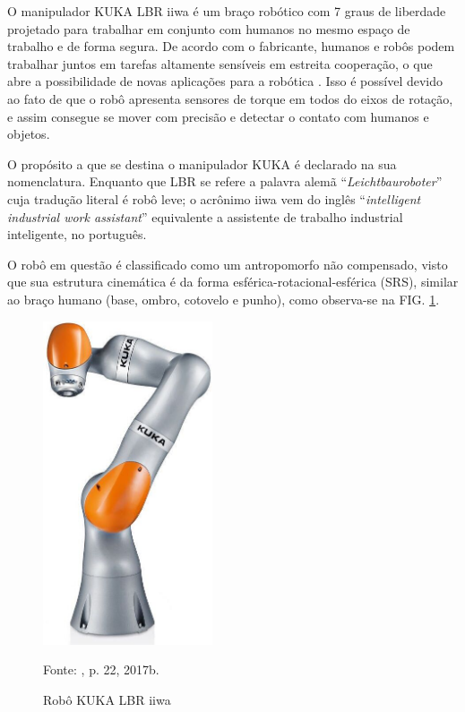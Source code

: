 O manipulador KUKA LBR iiwa é um braço robótico com 7 graus de liberdade projetado para trabalhar em conjunto com humanos no mesmo espaço de trabalho e de forma segura. De acordo com o fabricante, humanos e robôs podem trabalhar juntos em tarefas altamente sensíveis em estreita cooperação, o que abre a possibilidade de novas aplicações para a robótica \citep{KUKAmanual}. Isso é possível devido ao fato de que o robô apresenta sensores de torque em todos do eixos de rotação, e assim consegue se mover com precisão e detectar o contato com humanos e objetos. 

O propósito a que se destina o manipulador KUKA é declarado na sua nomenclatura. Enquanto que LBR se refere a palavra alemã ``\textit{Leichtbauroboter}'' cuja tradução literal é robô leve; o acrônimo iiwa vem do inglês ``\textit{intelligent industrial work assistant}'' equivalente a assistente de trabalho industrial inteligente, no português.

O robô em questão é classificado como um antropomorfo não compensado, visto que sua estrutura cinemática é da forma esférica-rotacional-esférica (SRS), similar ao braço humano (base, ombro, cotovelo e punho), como observa-se na FIG. \ref{fig:robo_iiwa}.

\begin{figure}[H]
    \centering
    \includegraphics[width=5cm]{Imagem/KUKA.jpg}
    \caption{Robô KUKA LBR iiwa}
    \label{fig:robo_iiwa}
    \begin{flushleft}
    Fonte: \citeauthor{KUKAapresentacao}, p. 22, 2017b.
    \end{flushleft}
\end{figure}

